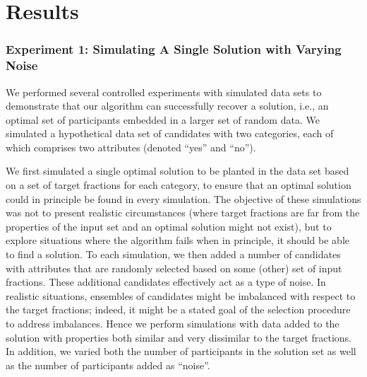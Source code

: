 \documentclass[12pt]{article}
\begin{document}
\section*{Results}
\label{sec:results}
\subsubsection*{Experiment 1: Simulating A Single Solution with Varying Noise}
\label{sec:simulations}

We performed several controlled experiments with simulated data sets to demonstrate that our algorithm can successfully recover a solution, i.e., an optimal set of participants embedded in a larger set of random data. We simulated a hypothetical data set of candidates with two categories, each of which comprises two attributes (denoted ``yes'' and ``no'').

We first simulated a single optimal solution to be planted in the data set based on a set of target fractions for each category, to ensure that an optimal solution could in principle be found in every simulation. The objective of these simulations was not to present realistic circumstances (where target fractions are far from the properties of the input set and an optimal solution might not exist), but to explore situations where the algorithm fails when in principle, it should be able to find a solution. To each simulation, we then added a number of candidates with attributes that are randomly selected based on some (other) set of input fractions. These additional candidates effectively act as a type of noise. In realistic situations, ensembles of candidates might be imbalanced with respect to the target fractions; indeed, it might be a stated goal of the selection procedure to address imbalances. Hence we perform simulations with data added to the solution with properties both similar and very dissimilar to the target fractions.
In addition, we varied both the number of participants in the solution set as well as the number of participants added as ``noise''.
\end{document}
